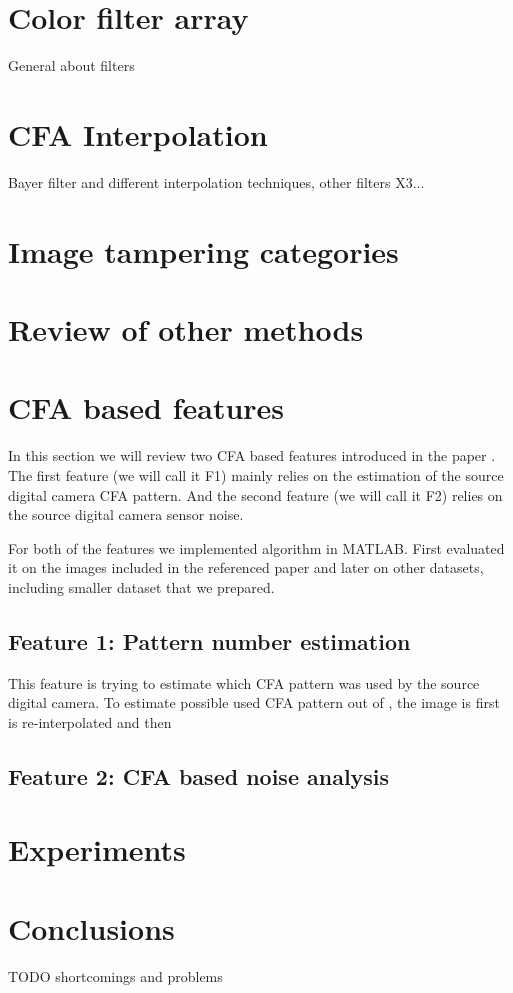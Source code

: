 \documentclass{template/acm_proc_article-sp}
\begin{document}
\section{Color filter array}
General about filters


\section{CFA Interpolation}
Bayer filter and different interpolation techniques, other filters X3...

\section{Image tampering categories}

\section{Review of other methods}


\section{CFA based features}
In this section we will review two CFA based features introduced in the paper \cite{dirik2009image}. The first feature (we will call it F1) mainly relies on the estimation of the source digital camera CFA pattern. And the second feature (we will call it F2) relies on the source digital camera sensor noise.

For both of the features we implemented algorithm in MATLAB. First evaluated it on the images included in the referenced paper \cite{dirik2009image} and later on other datasets, including smaller dataset that we prepared.

\subsection{Feature 1: Pattern number estimation}
This feature is trying to estimate which CFA pattern was used by the source digital camera. To estimate possible used CFA pattern out of , the image is first  is re-interpolated and then

\subsection{Feature 2: CFA based noise analysis}


\section{Experiments}

\section{Conclusions}
TODO
shortcomings and problems



\end{document}
